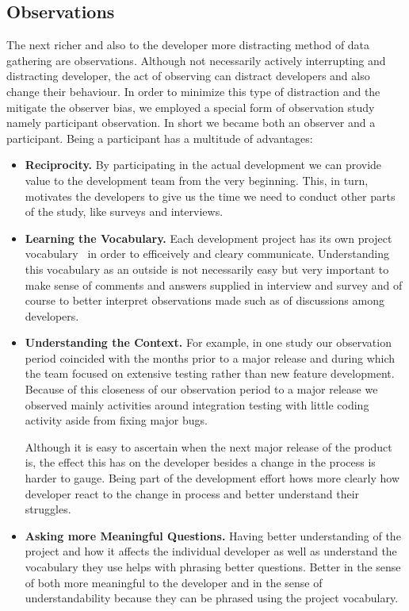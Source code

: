 \subsection{Observations}
The next richer and also to the developer more distracting method of data gathering are observations.
Although not necessarily actively interrupting and distracting developer, the act of observing can distract developers and also change their behaviour.
In order to minimize this type of distraction and the mitigate the observer bias, we employed a special form of observation study namely participant observation.
In short we became both an observer and a participant.
%
Being a participant has a multitude of advantages:

\begin{itemize}
\item\textbf{Reciprocity.} By participating in the actual development we can provide value to the development team from the very beginning.
This, in turn, motivates the developers to give us the time we need to conduct other parts of the study, like surveys and interviews.
\item\textbf{Learning the Vocabulary.} Each development project has its own project vocabulary~\cite{espinosa2007:team_knowledge} in order to efficeively and cleary communicate. 
Understanding this vocabulary as an outside is not necessarily easy but very important to make sense of comments and answers supplied in interview and survey and of course to better interpret observations made such as of discussions among developers.
\item\textbf{Understanding the Context.} For example, in one study our observation period coincided with the months prior to a major release and during which the team focused on extensive testing rather than new feature development. 
Because of this closeness of our observation period to a major release we observed mainly activities around integration testing with little coding activity aside from fixing major bugs.

Although it is easy to ascertain when the next major release of the product is, the effect this has on the developer besides a change in the process is harder to gauge.
Being part of the development effort hows more clearly how developer react to the change in process and better understand their struggles.

\item\textbf{Asking more Meaningful Questions.} Having better understanding of the project and how it affects the individual developer as well as understand the vocabulary they use helps with phrasing better questions.
Better in the sense of both more meaningful to the developer and in the sense of understandability because they can be phrased using the project vocabulary.
\end{itemize}

